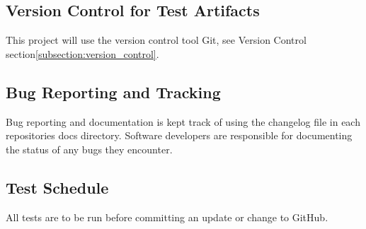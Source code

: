 \subsection{Version Control for Test Artifacts}

This project will use the version control tool Git, see Version Control section\:\ref{subsection:version_control}.



\subsection{Bug Reporting and Tracking}

Bug reporting and documentation is kept track of using the changelog file in each repositories docs directory. Software developers are responsible for documenting the status of any bugs they encounter.



\subsection{Test Schedule}

All tests are to be run before committing an update or change to GitHub.



